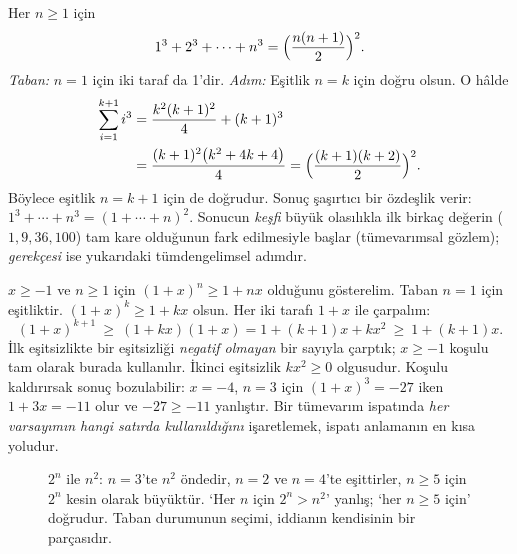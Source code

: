 \begin{ornek}
Her $n\ge1$ için
\[
1^3+2^3+\cdots+n^3=\Bigl(\frac{n(n+1)}{2}\Bigr)^2 .
\]
\emph{Taban:} $n=1$ için iki taraf da 1’dir. \emph{Adım:} Eşitlik $n=k$ için doğru olsun. O hâlde
\begin{align*}
\sum_{i=1}^{k+1}i^3&=\frac{k^2(k+1)^2}{4}+(k+1)^3\\
&=\frac{(k+1)^2\bigl(k^2+4k+4\bigr)}{4}=\Bigl(\frac{(k+1)(k+2)}{2}\Bigr)^2 .
\end{align*}
Böylece eşitlik $n=k+1$ için de doğrudur. Sonuç şaşırtıcı bir özdeşlik verir: $1^3+\cdots+n^3=(1+\cdots+n)^2$. Sonucun \emph{keşfi} büyük olasılıkla ilk birkaç değerin ($1,9,36,100$) tam kare olduğunun fark edilmesiyle başlar (tümevarımsal gözlem); \emph{gerekçesi} ise yukarıdaki tümdengelimsel adımdır.
\end{ornek}

\begin{ornek}
$x\ge-1$ ve $n\ge1$ için $(1+x)^n\ge1+nx$ olduğunu gösterelim. Taban $n=1$ için eşitliktir. $(1+x)^k\ge1+kx$ olsun. Her iki tarafı $1+x$ ile çarpalım:
\[
(1+x)^{k+1}\ \ge\ (1+kx)(1+x)=1+(k+1)x+kx^2\ \ge\ 1+(k+1)x .
\]
İlk eşitsizlikte bir eşitsizliği \emph{negatif olmayan} bir sayıyla çarptık; $x\ge-1$ koşulu tam olarak burada kullanılır. İkinci eşitsizlik $kx^2\ge0$ olgusudur. Koşulu kaldırırsak sonuç bozulabilir: $x=-4$, $n=3$ için $(1+x)^3=-27$ iken $1+3x=-11$ olur ve $-27\ge-11$ yanlıştır. Bir tümevarım ispatında \emph{her varsayımın hangi satırda kullanıldığını} işaretlemek, ispatı anlamanın en kısa yoludur.
\end{ornek}

\begin{figure}[htbp]
\centering
{}
\caption{$2^n$ ile $n^2$: $n=3$’te $n^2$ öndedir, $n=2$ ve $n=4$’te eşittirler, $n\ge5$ için $2^n$ kesin olarak büyüktür. ‘Her $n$ için $2^n>n^2$’ yanlış; ‘her $n\ge5$ için’ doğrudur. Taban durumunun seçimi, iddianın kendisinin bir parçasıdır.}
\end{figure}

